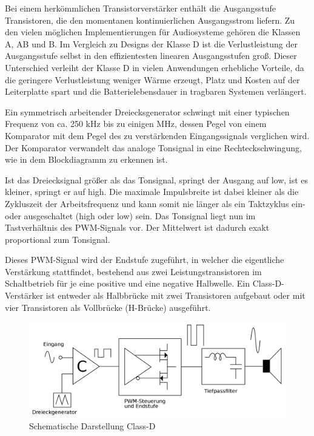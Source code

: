 Bei einem herkömmlichen Transistorverstärker enthält die Ausgangsstufe Transistoren, die den momentanen kontinuierlichen Ausgangsstrom liefern.
Zu den vielen möglichen Implementierungen für Audiosysteme gehören die Klassen A, AB und B.
Im Vergleich zu Designs der Klasse D ist die Verlustleistung der Ausgangsstufe selbst in den effizientesten linearen Ausgangsstufen groß.
Dieser Unterschied verleiht der Klasse D in vielen Anwendungen erhebliche Vorteile, da die geringere Verlustleistung weniger Wärme erzeugt, Platz und Kosten auf der Leiterplatte spart und die Batterielebensdauer in tragbaren Systemen verlängert.\par

Ein symmetrisch arbeitender Dreiecksgenerator schwingt mit einer typischen Frequenz von ca. 250 kHz bis zu einigen MHz, dessen Pegel von einem Komparator mit dem Pegel des zu verstärkenden Eingangssignals verglichen wird. 
Der Komparator verwandelt das analoge Tonsignal in eine Rechteckschwingung, wie in dem Blockdiagramm zu erkennen ist.\par

Ist das Dreiecksignal größer als das Tonsignal, springt der Ausgang auf low, ist es kleiner, springt er auf high. 
Die maximale Impulsbreite ist dabei kleiner als die Zykluszeit der Arbeitsfrequenz und kann somit nie länger als ein Taktzyklus ein- oder ausgeschaltet (high oder low) sein. Das Tonsignal liegt nun im Tastverhältnis des PWM-Signals vor. 
Der Mittelwert ist dadurch exakt proportional zum Tonsignal.\par

Dieses PWM-Signal wird der Endstufe zugeführt, in welcher die eigentliche Verstärkung stattfindet, bestehend aus zwei Leistungstransistoren im Schaltbetrieb für je eine positive und eine negative Halbwelle.
Ein Class-D-Verstärker ist entweder als Halbbrücke mit zwei Transistoren aufgebaut oder mit vier Transistoren als Vollbrücke (H-Brücke) ausgeführt.

\begin{figure}[htbp!]
	\centering
	\includegraphics[width=.9\linewidth]{images/technische_grundlagen/class-d-schematisch.png}
	\caption{Schematische Darstellung Class-D \cite{wikimedia-pwm-amp}}
\end{figure}
